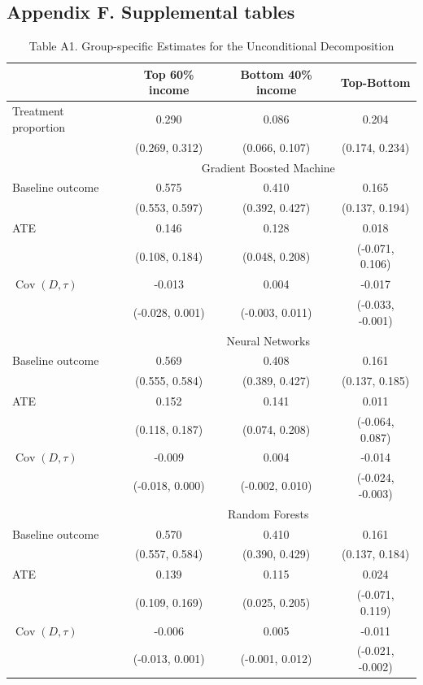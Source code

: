 \documentclass[12pt,a4paper]{article}
\newcommand{\Cov}{\operatorname{Cov}}
\begin{document}
\subsection*{Appendix F. Supplemental tables}
\begin{table}[htbp]
\centering
\caption*{Table A1. Group-specific Estimates for the Unconditional Decomposition} 
\begin{tabular}{lccc}
  \hline
   &  Top 60\% income & Bottom 40\% income  & Top-Bottom \\ 
  \hline
  Treatment proportion & 0.290 & 0.086 & 0.204 \\ 
   & (0.269, 0.312) & (0.066, 0.107) & (0.174, 0.234) \\
  & \multicolumn{3}{c}{Gradient Boosted Machine}  \\
  Baseline outcome & 0.575 & 0.410 & 0.165 \\ 
   & (0.553, 0.597) & (0.392, 0.427) & (0.137, 0.194) \\
  ATE & 0.146 & 0.128 & 0.018 \\ 
  & (0.108, 0.184) & (0.048, 0.208) & (-0.071, 0.106) \\
  $\Cov(D, \tau)$ & -0.013 & 0.004 & -0.017 \\ 
  & (-0.028, 0.001) & (-0.003, 0.011) & (-0.033, -0.001) \\
  & \multicolumn{3}{c}{Neural Networks}  \\
  Baseline outcome & 0.569 & 0.408 & 0.161 \\ 
  & (0.555, 0.584) & (0.389, 0.427) & (0.137, 0.185) \\
  ATE & 0.152 & 0.141 & 0.011 \\ 
  & (0.118, 0.187) & (0.074, 0.208) & (-0.064, 0.087) \\
  $\Cov(D, \tau)$ & -0.009 & 0.004 & -0.014 \\ 
  & (-0.018, 0.000) & (-0.002, 0.010) & (-0.024, -0.003) \\
  & \multicolumn{3}{c}{Random Forests}  \\
  Baseline outcome & 0.570 & 0.410 & 0.161 \\ 
  & (0.557, 0.584) & (0.390, 0.429) & (0.137, 0.184) \\
  ATE & 0.139 & 0.115 & 0.024 \\ 
  & (0.109, 0.169) & (0.025, 0.205) & (-0.071, 0.119) \\
  $\Cov(D, \tau)$ & -0.006 & 0.005 & -0.011 \\ 
  & (-0.013, 0.001) & (-0.001, 0.012) & (-0.021, -0.002) \\

\end{tabular}
\end{table}
\end{document}
